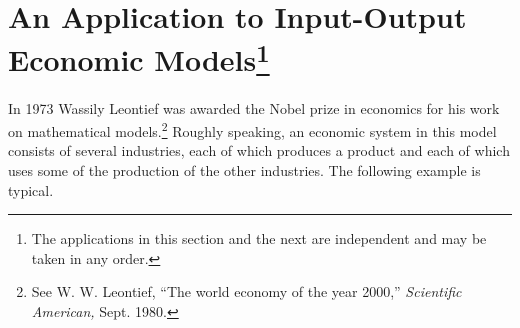\section[An Application to Input-Output Economic Models]{An Application to Input-Output Economic Models\footnote{The applications in this section and the next are independent and may be taken in any order.}}
\label{sec:2_8}


In 1973 Wassily Leontief was awarded the Nobel prize in economics for his work on mathematical models.\footnote{See W. W. Leontief, ``The world economy of the year 2000,'' \textit{Scientific American,} Sept. 1980.} Roughly speaking, an economic system in this model consists of several industries, each of which produces a product and each of which uses some of the production of the other industries. The following example is typical.

